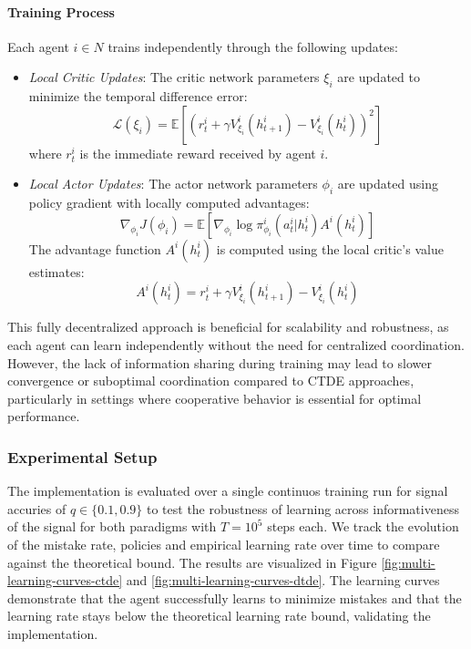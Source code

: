 \paragraph{Training Process}
Each agent $i \in N$ trains independently through the following updates:

\begin{itemize}
    \item \textit{Local Critic Updates}: The critic network parameters $\xi_i$ are updated to minimize the temporal difference error:
    \[
        \mathcal{L}(\xi_i) = \mathbb{E}\left[(r_t^i + \gamma V^i_{\xi_i}(h_{t+1}^i) - V^i_{\xi_i}(h_t^i))^2\right]
    \]
    where $r_t^i$ is the immediate reward received by agent $i$.
    
    \item \textit{Local Actor Updates}: The actor network parameters $\phi_i$ are updated using policy gradient with locally computed advantages:
    \[
        \nabla_{\phi_i} J(\phi_i) = \mathbb{E}\left[\nabla_{\phi_i} \log \pi^i_{\phi_i}(a^i_t|h^i_t) A^i(h^i_t)\right]
    \]
    The advantage function $A^i(h^i_t)$ is computed using the local critic's value estimates:
    \[
        A^i(h^i_t) = r_t^i + \gamma V^i_{\xi_i}(h_{t+1}^i) - V^i_{\xi_i}(h_t^i)
    \]
\end{itemize}

This fully decentralized approach is beneficial for scalability and robustness, as each agent can learn independently without the need for centralized coordination. However, the lack of information sharing during training may lead to slower convergence or suboptimal coordination compared to CTDE approaches, particularly in settings where cooperative behavior is essential for optimal performance.

\subsubsection*{Experimental Setup}
The implementation is evaluated over a single continuos training run for signal accuries of $q \in \{0.1, 0.9\}$ to test the robustness of learning across informativeness of the signal for both paradigms with $T=10^5$ steps each. We track the evolution of the mistake rate, policies and empirical learning rate over time to compare against the theoretical bound. The results are visualized in Figure \ref{fig:multi-learning-curves-ctde} and \ref{fig:multi-learning-curves-dtde}. The learning curves demonstrate that the agent successfully learns to minimize mistakes and that the learning rate stays below the theoretical learning rate bound, validating the implementation.

